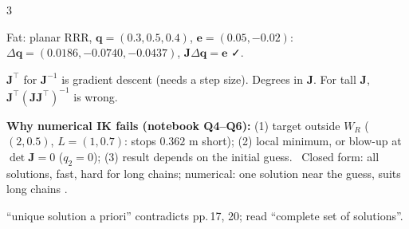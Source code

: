 \begin{multicols}{3}
\begin{worked}
Fat: planar RRR, $\mathbf q=(0.3,0.5,0.4)$, $\mathbf e=(0.05,-0.02)$: $\Delta\mathbf q=(0.0186,-0.0740,-0.0437)$, $\mathbf J\Delta\mathbf q=\mathbf e$ ✓. \chk
\end{worked}
\begin{trap}$\mathbf J^\top$ for $\mathbf J^{-1}$ is gradient descent (needs a step size). Degrees in $\mathbf J$. For tall $\mathbf J$, $\mathbf J^\top(\mathbf J\mathbf J^\top)^{-1}$ is wrong.\end{trap}
\textbf{Why numerical IK fails (notebook Q4--Q6):} (1) target outside $W_R$ ($(2,0.5)$, $L=(1,0.7)$: stops $0.362$ m short); (2) local minimum, or blow-up at $\det\mathbf J=0$ ($q_2=0$); (3) result depends on the initial guess. \chk\ Closed form: all solutions, fast, hard for long chains; numerical: one solution near the guess, suits long chains .
\begin{slideerr}[p.\,54]``unique solution a priori'' contradicts pp.\,17, 20; read ``complete set of solutions''.\end{slideerr}


\end{multicols}
